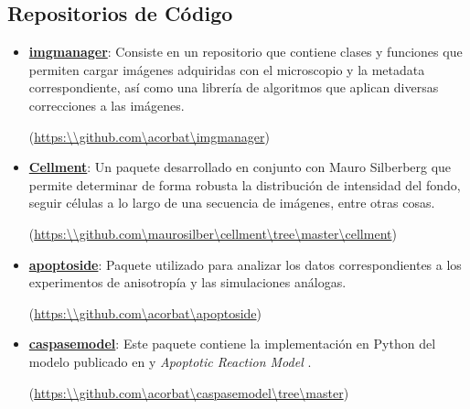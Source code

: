 \begin{appendices}


\chapter{Repositorios de Código}
\label{repositorio}

\begin{itemize}
    

\item \href{https://github.com/acorbat/img_manager}{\textbf{img\textunderscore manager}}: Consiste en un repositorio que contiene clases y funciones que permiten cargar imágenes adquiridas con el microscopio y la metadata correspondiente, así como una librería de algoritmos que aplican diversas correcciones a las imágenes.

(\href{https://github.com/acorbat/img_manager}{https:\textbackslash \textbackslash github.com\textbackslash acorbat\textbackslash img\textunderscore manager})

\item \href{https://github.com/maurosilber/cellment/tree/master/cellment}{\textbf{Cellment}}: Un paquete desarrollado en conjunto con Mauro Silberberg que permite determinar de forma robusta la distribución de intensidad del fondo, seguir células a lo largo de una secuencia de imágenes, entre otras cosas.

(\href{https://github.com/maurosilber/cellment/tree/master/cellment}{https:\textbackslash \textbackslash github.com\textbackslash maurosilber\textbackslash cellment\textbackslash tree\textbackslash master\textbackslash cellment})

\item \href{https://github.com/acorbat/apoptoside}{\textbf{apoptoside}}: Paquete utilizado para analizar los datos correspondientes a los experimentos de anisotropía y las simulaciones análogas.

(\href{https://github.com/acorbat/apoptoside}{https:\textbackslash \textbackslash github.com\textbackslash acorbat\textbackslash apoptoside})

\item \href{https://github.com/acorbat/caspase_model/tree/master}{\textbf{caspase\textunderscore model}}: Este paquete contiene la implementación en Python del modelo publicado en \cite{Corbat2018} y \textit{Apoptotic Reaction Model} \citep{Corbat2021}.

(\href{https://github.com/acorbat/caspase_model/tree/master}{https:\textbackslash \textbackslash github.com\textbackslash acorbat\textbackslash caspase\textunderscore model\textbackslash tree\textbackslash master})


\end{itemize}
\end{appendices}
